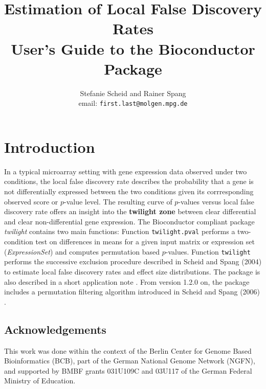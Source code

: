 \documentclass[11pt,a4paper,fleqn]{report}
\title{Estimation of Local False Discovery Rates \bigskip \\ User's Guide to the Bioconductor Package \Rpackage{twilight}}
\author{Stefanie Scheid and Rainer Spang \bigskip \\
  \small email: \texttt{first.last@molgen.mpg.de}
  }
\date{}
\newcommand{\Rfunction}[1]{{\texttt{#1}}}
\newcommand{\Rpackage}[1]{{\textit{#1}}}
\newcommand{\Rclass}[1]{{\textit{#1}}}
\begin{document}
\maketitle



\chapter{Introduction}

In a typical microarray setting with gene expression data observed under two conditions, the local false discovery rate describes the probability that a gene is not differentially expressed between the two conditions given its corrresponding observed score or $p$-value level. The resulting curve of $p$-values versus local false discovery rate offers an insight into the \textbf{twilight zone} between clear differential and clear non-differential gene expression. The Bioconductor compliant package \Rpackage{twilight} contains two main functions: Function \Rfunction{twilight.pval} performs a two-condition test on differences in means for a given input matrix or expression set (\Rclass{ExpressionSet}) and computes permutation based $p$-values. Function \Rfunction{twilight} performs the successive exclusion procedure described in Scheid and Spang (2004) \cite{scheid04} to estimate local false discovery rates and effect size distributions. The package is also described in a short application note \cite{scheid05}. From version 1.2.0 on, the package includes a permutation filtering algorithm introduced in Scheid and Spang (2006) \cite{scheid06}.


\section*{Acknowledgements}

This work was done within the context of the Berlin Center for Genome Based Bioinformatics (BCB), part of the German National Genome Network (NGFN), and supported by BMBF grants 031U109C and 03U117 of the German Federal Ministry of Education.



\end{document}

